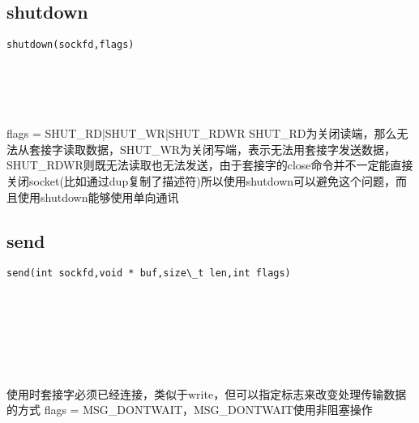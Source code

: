 \documentclass[10pt,a4paper]{article}
\begin{document}
\subsection{shutdown}
\begin{spacing}{2.0}
\lstset{language=C,numbers=none}
\begin{lstlisting}
shutdown(sockfd,flags)
\end{lstlisting}
{\large\color[rgb]{0.2,0.4,0.6}{sockfd:}} \\
{\large\color[rgb]{0.2,0.4,0.6}{flags:}}
\paragraph{ \ \ }flags = SHUT\_RD|SHUT\_WR|SHUT\_RDWR SHUT\_RD为关闭读端，那么无法从套接字读取数据，SHUT\_WR为关闭写端，表示无法用套接字发送数据，SHUT\_RDWR则既无法读取也无法发送，由于套接字的close命令并不一定能直接关闭socket(比如通过dup复制了描述符)所以使用shutdown可以避免这个问题，而且使用shutdown能够使用单向通讯
\end{spacing}

\subsection{send}
\begin{spacing}{2.0}
\lstset{language=C,numbers=none}
\begin{lstlisting}
send(int sockfd,void * buf,size\_t len,int flags)
\end{lstlisting}
{\large\color[rgb]{0.2,0.4,0.6}{sockfd:}} \\
{\large\color[rgb]{0.2,0.4,0.6}{buf:}} \\
{\large\color[rgb]{0.2,0.4,0.6}{len:}} \\
{\large\color[rgb]{0.2,0.4,0.6}{flags:}}
\paragraph{ \ \ }使用时套接字必须已经连接，类似于write，但可以指定标志来改变处理传输数据的方式 flags = MSG\_DONTWAIT，MSG\_DONTWAIT使用非阻塞操作
\end{spacing}
\end{document}
